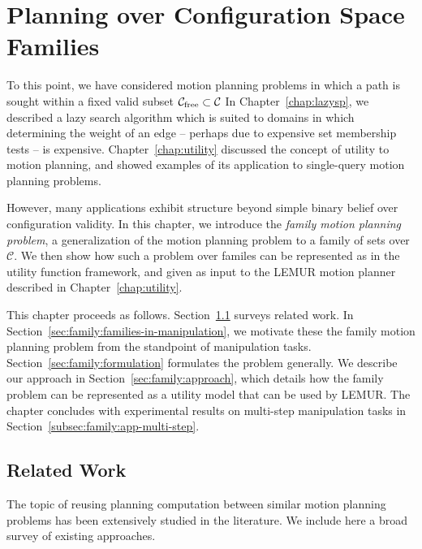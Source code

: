 \chapter{Planning over Configuration Space Families}
\label{chap:family}

To this point,
we have considered motion planning problems in which a path is sought
within a fixed valid subset
$\mathcal{C}_{\mbox{\scriptsize free}} \subset \mathcal{C}$
In Chapter~\ref{chap:lazysp},
we described a lazy search algorithm which is suited to domains in
which determining the weight of an edge
-- perhaps due to expensive set membership tests --
is expensive.
Chapter~\ref{chap:utility} discussed the concept of utility to
motion planning,
and showed examples of its application to single-query motion
planning problems.

However,
many applications exhibit structure beyond simple binary belief over
configuration validity.
In this chapter,
we introduce the \emph{family motion planning problem},
a generalization of the motion planning problem to a family of sets
over $\mathcal{C}$.
We then show how such a problem over familes can be represented
as in the utility function framework,
and given as input to the LEMUR motion planner described
in Chapter~\ref{chap:utility}.

This chapter proceeds as follows.
Section~\ref{sec:family:related-work} surveys related work.
In Section~\ref{sec:family:families-in-manipulation},
we motivate these the family motion planning problem
from the standpoint of manipulation tasks.
Section~\ref{sec:family:formulation} formulates the problem
generally.
We describe our approach in Section~\ref{sec:family:approach},
which details how the family problem can be represented
as a utility model that can be used by LEMUR.
The chapter concludes with experimental results on multi-step
manipulation tasks in Section~\ref{subsec:family:app-multi-step}.

\section{Related Work}
\label{sec:family:related-work}

The topic of reusing planning computation
between similar motion planning problems
has been extensively studied in the literature.
We include here a broad survey of existing approaches.

